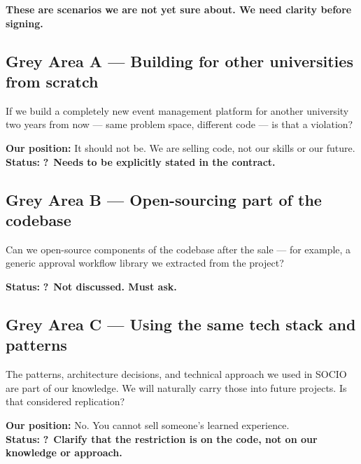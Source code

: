 \documentclass[12pt,a4paper]{article}
\newcommand{\ask}{\textcolor{amber}{\textbf{?}}}
\begin{document}
\begin{questionbox}
\textbf{\color{amber} These are scenarios we are not yet sure about. We need clarity before signing.}
\end{questionbox}

\vspace{0.4cm}

\subsection{Grey Area A — Building for other universities from scratch}

If we build a completely new event management platform for another university two years from now — same problem space, different code — is that a violation?

\textbf{Our position:} It should not be. We are selling code, not our skills or our future.\\
\textbf{Status:} \ask\ \textbf{Needs to be explicitly stated in the contract.}

\vspace{0.3cm}

\subsection{Grey Area B — Open-sourcing part of the codebase}

Can we open-source components of the codebase after the sale — for example, a generic approval workflow library we extracted from the project?

\textbf{Status:} \ask\ \textbf{Not discussed. Must ask.}

\vspace{0.3cm}

\subsection{Grey Area C — Using the same tech stack and patterns}

The patterns, architecture decisions, and technical approach we used in SOCIO are part of our knowledge. We will naturally carry those into future projects. Is that considered replication?

\textbf{Our position:} No. You cannot sell someone's learned experience.\\
\textbf{Status:} \ask\ \textbf{Clarify that the restriction is on the code, not on our knowledge or approach.}

\vspace{0.3cm}
\end{document}
